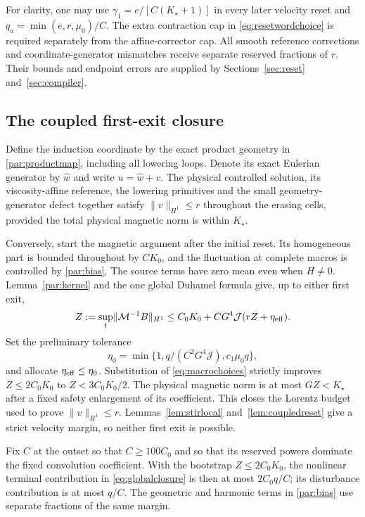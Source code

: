 \documentclass[11pt,a4paper]{amsart}
\theoremstyle{definition}
\theoremstyle{remark}
\numberwithin{equation}{section}
\newcommand{\Mcal}{\mathcal M}
\newcommand{\norm}[1]{\lVert #1\rVert}
\begin{document}
For clarity, one may use $\gamma_1=e/[C(K_\star+1)]$ in every later velocity reset and $q_a=\min(e,r,\mu_0)/C$. The extra contraction cap in \eqref{eq:resetwordchoice} is required separately from the affine-corrector cap. All smooth reference corrections and coordinate-generator mismatches receive separate reserved fractions of $r$. Their bounds and endpoint errors are supplied by Sections~\ref{sec:reset} and~\ref{sec:compiler}.

\subsection{The coupled first-exit closure}
Define the induction coordinate by the exact product geometry in
\eqref{par:productmap}, including all lowering loops. Denote its exact Eulerian generator by $\widehat w$ and write $u=\widehat w+v$. The physical controlled solution, its viscosity-affine reference, the lowering primitives and the small geometry-generator defect together satisfy $\norm v_{H^1}\le r$ throughout the erasing cells, provided the total physical magnetic norm is within $K_\star$.

Conversely, start the magnetic argument after the initial reset. Its homogeneous part is bounded throughout by $CK_0$, and the fluctuation at complete macros is controlled by \eqref{par:bias}. The source terms have zero mean even when $H\ne0$. Lemma~\ref{par:kernel} and the one global Duhamel formula give, up to either first exit,
\begin{equation}\label{eq:globalclosure}
 Z:=\sup_t\norm{\Mcal^{-1}B}_{H^1}
 \le C_0K_0+C G^4\mathcal J(rZ+\eta_{\rm eff}).
\end{equation}
Set the preliminary tolerance
\begin{equation}\label{eq:eta0}
 \eta_0=\min\{1,q/(C^2G^4\mathcal J),c_1\mu_0q\},
\end{equation}
and allocate $\eta_{\rm eff}\le\eta_0$. Substitution of \eqref{eq:macrochoices} strictly improves $Z\le2C_0K_0$ to $Z<3C_0K_0/2$. The physical magnetic norm is at most $GZ<K_\star$ after a fixed safety enlargement of its coefficient. This closes the Lorentz budget used to prove $\norm v_{H^1}\le r$. Lemmas~\ref{lem:stirlocal} and~\ref{lem:coupledreset} give a strict velocity margin, so neither first exit is possible.

Fix $C$ at the outset so that $C\ge 100C_0$ and so that its reserved powers dominate the fixed convolution coefficient. With the bootstrap $Z\le2C_0K_0$, the nonlinear terminal contribution in \eqref{eq:globalclosure} is then at most $2C_0q/C$; its disturbance contribution is at most $q/C$. The geometric and harmonic terms in \eqref{par:bias} use separate fractions of the same margin.
\end{document}
